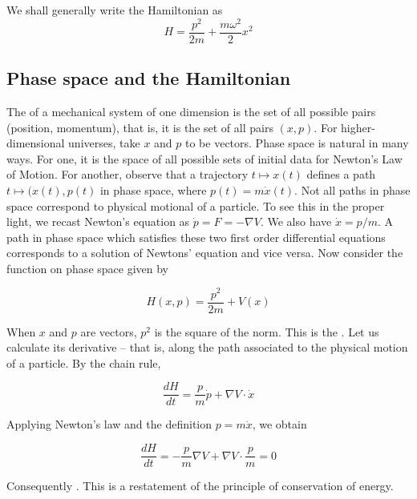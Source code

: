 \begin{remark}
We shall generally write the Hamiltonian as
\[
H  = \frac{p^2}{2m} + \frac{m\omega^2 }{2 } x^2 
\]
\end{remark}


\subsection{Phase space and the Hamiltonian}

The  of a mechanical system of one dimension is the set of all possible pairs (position, momentum), that is, it is the set of all pairs
$(x,p)$.  For higher-dimensional universes, take $x$ and $p$ to be vectors.  Phase space is natural in many ways.  For one, it is the space of all possible sets of initial data for Newton's Law of Motion.  For another, observe that a trajectory $t \mapsto x(t)$ defines a path $t \mapsto (x(t), p(t)$ in phase space, where $p(t) = m\dot x(t)$.  Not all paths in phase space correspond to physical motional of a particle.  To see this in the proper light, we recast Newton's equation as $\dot p = F = -\nabla V$.  We also have $\dot x = p/m$.   A path in phase space which satisfies these two first order differential equations corresponds to a solution of Newtons' equation and vice versa.   Now consider the function on phase space given by

\begin{equation}
H(x, p) = \frac{p^2}{2m} + V(x)
\end{equation}

When $x$ and $p$ are vectors, $p^2$ is the square of the norm.  This is the .  Let us calculate its derivative  -- that is, along the path associated to the physical motion of a particle.  By the chain rule, 

\begin{equation}
\frac{dH}{dt} = \frac{p}{m} \dot p + \nabla V\cdot \dot x
\end{equation}

Applying Newton's law and the definition $p = m\dot x $, we
obtain 

\begin{equation}
\frac{dH}{dt} = -\frac{p}{m} \nabla V + \nabla V\cdot \frac{p}{m} = 0
\end{equation}

Consequently .  This is a restatement of the principle of conservation of energy.

